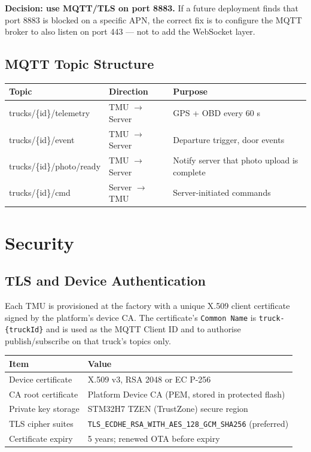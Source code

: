 \documentclass{article}
\begin{document}
\noindent\textbf{Decision: use MQTT/TLS on port 8883.}
If a future deployment finds that port 8883 is blocked on a specific APN, the
correct fix is to configure the MQTT broker to also listen on port 443 --- not
to add the WebSocket layer.

\subsection{MQTT Topic Structure}

\begin{center}
\begin{tabular}{>{\ttfamily}lll}
\toprule
\textbf{Topic} & \textbf{Direction} & \textbf{Purpose}\\
\midrule
trucks/\{id\}/telemetry   & TMU $\to$ Server & GPS + OBD every 60 s\\
trucks/\{id\}/event       & TMU $\to$ Server & Departure trigger, door events\\
trucks/\{id\}/photo/ready & TMU $\to$ Server & Notify server that photo upload is complete\\
trucks/\{id\}/cmd         & Server $\to$ TMU & Server-initiated commands\\
\bottomrule
\end{tabular}
\end{center}

\section{Security}

\subsection{TLS and Device Authentication}

Each TMU is provisioned at the factory with a unique X.509 client certificate
signed by the platform's device CA. The certificate's \texttt{Common Name} is
\texttt{truck-\{truckId\}} and is used as the MQTT Client ID and to authorise
publish/subscribe on that truck's topics only.

\begin{center}
\begin{tabular}{ll}
\toprule
\textbf{Item} & \textbf{Value}\\
\midrule
Device certificate & X.509 v3, RSA 2048 or EC P-256\\
CA root certificate & Platform Device CA (PEM, stored in protected flash)\\
Private key storage & STM32H7 TZEN (TrustZone) secure region\\
TLS cipher suites & \texttt{TLS\_ECDHE\_RSA\_WITH\_AES\_128\_GCM\_SHA256} (preferred)\\
Certificate expiry & 5 years; renewed OTA before expiry\\
\bottomrule
\end{tabular}
\end{center}
\end{document}
